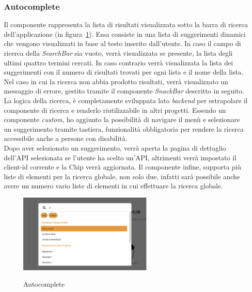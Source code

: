 \subsubsection{Autocomplete}\label{subsubsec:autocomplete}
Il componente rappresenta la lista di risultati visualizzata sotto la barra di ricerca dell'applicazione (in figura~\ref{fig:autocomplete}).
Essa consiste in una lista di suggerimenti dinamici che vengono visualizzati in base al testo inserito dall'utente. 
In caso il campo di ricerca della \textit{SearchBar} sia vuoto, verrà visualizzata se presente, la lista degli ultimi quattro termini cercati.
In caso contrario verrà visualizzata la lista dei suggerimenti con il numero di risultati trovati per ogni lista e il nome della lista.
Nel caso in cui la ricerca non abbia prodotto risultati, verrà visualizzato un messaggio di errore, gestito tramite il componente \textit{SnackBar} descritto in seguito.
La logica della ricerca, è completamente sviluppata lato \textit{backend} per estrapolare il componente di ricerca e renderlo riutilizzabile in altri progetti.
Essendo un componente \textit{custom}, ho aggiunto la possibilità di navigare il menù e selezionare un suggerimento tramite tastiera, funzionalità 
obbligatoria per rendere la ricerca accessibile anche a persone con disabilità.\\
Dopo aver selezionato un suggerimento, verrà aperta la pagina di dettaglio dell'API selezionata se l'utente ha scelto un'API, altrimenti verrà impostato il client-id corrente e la Chip verrà aggiornata.
Il componente infine, supporta più liste di elementi per la ricerca globale, non solo due, infatti sarà possibile anche avere un numero vario liste di elementi in cui effettuare
la ricerca globale. 

\begin{figure}[ht]
  \centering
  \includegraphics[width=0.6\textwidth, alt={Componente che si occupa della lista dinamica di risultati}]{images/frontend/SearchBar2.jpg}
  \caption{Autocomplete}\label{fig:autocomplete}
\end{figure}


